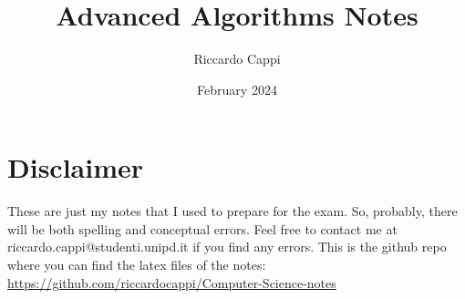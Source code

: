 \documentclass{book}
\title{Advanced Algorithms Notes}
\author{Riccardo Cappi}
\date{February 2024}
\begin{document}
\maketitle

\section{Disclaimer}
These are just my notes that I used to prepare for the exam. So, probably, there will be both spelling and conceptual errors. Feel free to contact me at riccardo.cappi@studenti.unipd.it if you find any errors. This is the github repo where you can find the latex files of the notes: \url{https://github.com/riccardocappi/Computer-Science-notes}

\tableofcontents























\end{document}
